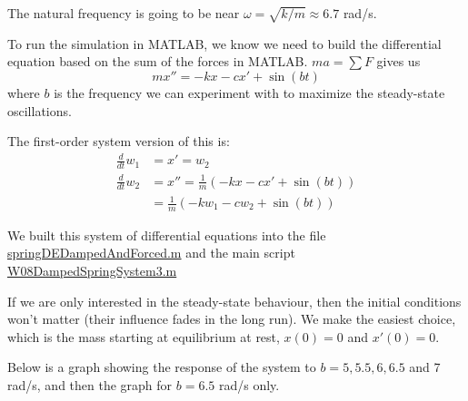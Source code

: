 \begin{enumerate}
 \begin{Solution}
   The natural frequency is going to be near
   $\omega = \sqrt{k/m} \approx 6.7$ rad/s.

   To run the simulation in MATLAB, we know we need to build the
   differential equation based on the sum of the forces in MATLAB.  $ma = \sum F$ gives us
$$ m x'' = -kx - c x' + \sin(bt)$$
where $b$ is the frequency we can experiment with to maximize the
steady-state oscillations.

The first-order system version of this is: 
 \begin{align*}
 \frac{d}{dt} w_1 & = x' = w_2 \\
 \frac{d}{dt} w_2 & = x'' =  \frac{1}{m} \left(-kx -c x'+ \sin(bt) \right) \\
& = \frac{1}{m} \left(-k w_1  - c w_2 + \sin(bt) \right)
 \end{align*}

 We built this system of differential equations into the file
 \href{http://www.mast.queensu.ca/~apsc171/MNTCP01/PracticeProblems/MATLAB/springDEDampedAndForced.m}{springDEDampedAndForced.m} 
and the main script
 \href{http://www.mast.queensu.ca/~apsc171/MNTCP01/PracticeProblems/MATLAB/W08DampedSpringSystem3.m}{W08DampedSpringSystem3.m} 

 If we are only interested in the steady-state behaviour, then the
 initial conditions won't matter (their influence fades in the long
 run). We make the easiest choice, which is the mass starting at
 equilibrium at rest, $x(0) = 0$ and $x'(0) = 0$.

 Below is a graph showing the response of the system to
 $b = 5, 5.5, 6, 6.5$ and 7 rad/s, and then the graph for $b = 6.5$
 rad/s only.


\end{Solution}
\end{enumerate}
